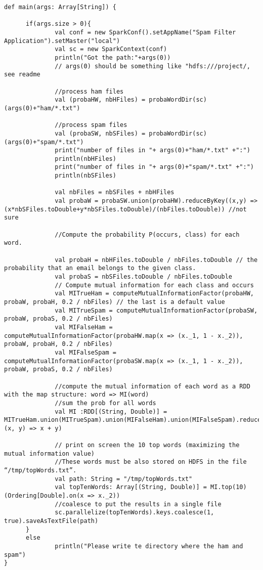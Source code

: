 \documentclass[paper=a4, fontsize=11pt]{scrartcl}
\numberwithin{equation}{section}		%
\numberwithin{figure}{section}			%
\numberwithin{table}{section}				%
\begin{document}
\begin{lstlisting}
def main(args: Array[String]) {

      if(args.size > 0){
              val conf = new SparkConf().setAppName("Spam Filter Application").setMaster("local")
              val sc = new SparkContext(conf)
              println("Got the path:"+args(0))
              // args(0) should be something like "hdfs:///project/, see readme

              //process ham files
              val (probaHW, nbHFiles) = probaWordDir(sc)(args(0)+"ham/*.txt")

              //process spam files
              val (probaSW, nbSFiles) = probaWordDir(sc)(args(0)+"spam/*.txt")
              print("number of files in "+ args(0)+"ham/*.txt" +":")
              println(nbHFiles)
              print("number of files in "+ args(0)+"spam/*.txt" +":")
              println(nbSFiles)

              val nbFiles = nbSFiles + nbHFiles
              val probaW = probaSW.union(probaHW).reduceByKey((x,y) => (x*nbSFiles.toDouble+y*nbSFiles.toDouble)/(nbFiles.toDouble)) //not sure

              //Compute the probability P(occurs, class) for each word.

              val probaH = nbHFiles.toDouble / nbFiles.toDouble // the probability that an email belongs to the given class.
              val probaS = nbSFiles.toDouble / nbFiles.toDouble
              // Compute mutual information for each class and occurs
              val MITrueHam = computeMutualInformationFactor(probaHW, probaW, probaH, 0.2 / nbFiles) // the last is a default value
              val MITrueSpam = computeMutualInformationFactor(probaSW, probaW, probaS, 0.2 / nbFiles)
              val MIFalseHam = computeMutualInformationFactor(probaHW.map(x => (x._1, 1 - x._2)), probaW, probaH, 0.2 / nbFiles)
              val MIFalseSpam = computeMutualInformationFactor(probaSW.map(x => (x._1, 1 - x._2)), probaW, probaS, 0.2 / nbFiles)

              //compute the mutual information of each word as a RDD with the map structure: word => MI(word)
              //sum the prob for all words
              val MI :RDD[(String, Double)] = MITrueHam.union(MITrueSpam).union(MIFalseHam).union(MIFalseSpam).reduceByKey( (x, y) => x + y)

              // print on screen the 10 top words (maximizing the mutual information value)
              //These words must be also stored on HDFS in the file “/tmp/topWords.txt”.
              val path: String = "/tmp/topWords.txt"
              val topTenWords: Array[(String, Double)] = MI.top(10)(Ordering[Double].on(x => x._2))
              //coalesce to put the results in a single file
              sc.parallelize(topTenWords).keys.coalesce(1, true).saveAsTextFile(path)
      }
      else
              println("Please write te directory where the ham and spam")
}

\end{lstlisting}
\end{document}
